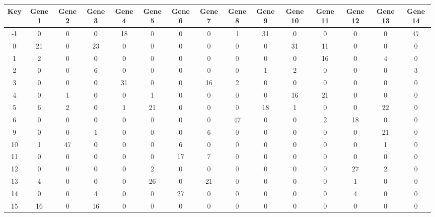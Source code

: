 \begin{tabular}{|c|c|c|c|c|c|c|c|c|c|c|c|c|c|c|}
\hline
Key & Gene 1 & Gene 2 & Gene 3 & Gene 4 & Gene 5 & Gene 6 & Gene 7 & Gene 8 & Gene 9 & Gene 10 & Gene 11 & Gene 12 & Gene 13 & Gene 14 \\
\hline
-1 & 0 & 0 & 0 & 18 & 0 & 0 & 0 & 1 & 31 & 0 & 0 & 0 & 0 & 47 \\
0 & 21 & 0 & 23 & 0 & 0 & 0 & 0 & 0 & 0 & 31 & 11 & 0 & 0 & 0 \\
1 & 2 & 0 & 0 & 0 & 0 & 0 & 0 & 0 & 0 & 0 & 16 & 0 & 4 & 0 \\
2 & 0 & 0 & 6 & 0 & 0 & 0 & 0 & 0 & 1 & 2 & 0 & 0 & 0 & 3 \\
3 & 0 & 0 & 0 & 31 & 0 & 0 & 16 & 2 & 0 & 0 & 0 & 0 & 0 & 0 \\
4 & 0 & 1 & 0 & 0 & 1 & 0 & 0 & 0 & 0 & 16 & 21 & 0 & 0 & 0 \\
5 & 6 & 2 & 0 & 1 & 21 & 0 & 0 & 0 & 18 & 1 & 0 & 0 & 22 & 0 \\
6 & 0 & 0 & 0 & 0 & 0 & 0 & 0 & 47 & 0 & 0 & 2 & 18 & 0 & 0 \\
9 & 0 & 0 & 1 & 0 & 0 & 0 & 6 & 0 & 0 & 0 & 0 & 0 & 21 & 0 \\
10 & 1 & 47 & 0 & 0 & 0 & 6 & 0 & 0 & 0 & 0 & 0 & 0 & 1 & 0 \\
11 & 0 & 0 & 0 & 0 & 0 & 17 & 7 & 0 & 0 & 0 & 0 & 0 & 0 & 0 \\
12 & 0 & 0 & 0 & 0 & 2 & 0 & 0 & 0 & 0 & 0 & 0 & 27 & 2 & 0 \\
13 & 4 & 0 & 0 & 0 & 26 & 0 & 21 & 0 & 0 & 0 & 0 & 1 & 0 & 0 \\
14 & 0 & 0 & 4 & 0 & 0 & 27 & 0 & 0 & 0 & 0 & 0 & 4 & 0 & 0 \\
15 & 16 & 0 & 16 & 0 & 0 & 0 & 0 & 0 & 0 & 0 & 0 & 0 & 0 & 0 \\
\hline
\end{tabular}